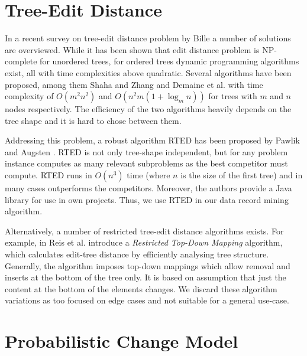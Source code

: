 \section{Tree-Edit Distance}
\label{sec:tree-edit-distance}

In a recent survey on tree-edit distance problem by Bille \cite{bille2005a} a number of solutions are overviewed. While it has been shown that edit distance problem is NP-complete for unordered trees, for ordered trees dynamic programming algorithms exist, all with time complexities above quadratic. Several algorithms have been proposed, among them Shaha and Zhang \cite{shasha1990a} and Demaine et al. \cite{demaine2007a} with time complexity of $O(m^2 n^2)$ and $O(n^ 2m(1+\log_m n))$  for trees with $m$ and $n$ nodes respectively. The efficiency of the two algorithms heavily depends on the tree shape and it is hard to chose between them. 

Addressing this problem, a robust algorithm RTED has been proposed by Pawlik and Augsten \cite{pawlik2011a}. RTED is not only tree-shape independent, but for any problem instance computes as many relevant subproblems as the best competitor must compute. RTED runs in $O(n^3)$ time (where $n$ is the size of the first tree) and in many cases outperforms the competitors. Moreover, the authors provide a Java library for use in own projects. Thus, we use RTED in our data record mining algorithm.

Alternatively, a number of restricted tree-edit distance algorithms exists. For example, in \cite{de2004a} Reis et al. introduce a \emph{Restricted Top-Down Mapping} algorithm, which calculates edit-tree distance by efficiently analysing tree structure. Generally, the algorithm imposes top-down mappings which allow removal and inserts at the bottom of the tree only. It is based on assumption that just the content at the bottom of the elements changes. We discard these algorithm variations as too focused on edge cases and not suitable for a general use-case.


\section{Probabilistic Change Model}

